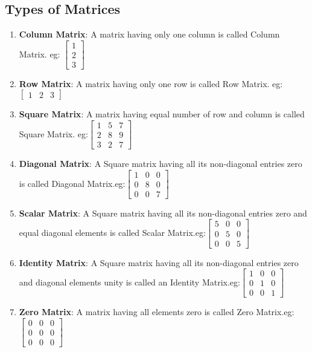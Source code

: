 \documentclass[12pt]{article}
\begin{document}
        \subsection*{Types of Matrices}
        \begin{enumerate}
          \item  \textbf{Column Matrix}: A matrix having only one column is called Column Matrix.
         eg: $\begin{bmatrix}
            1 \\
            2 \\
            3
            \end{bmatrix}$
            \item \textbf{Row Matrix}: A matrix having only one row is called Row Matrix. eg: $\begin{bmatrix}
                1 & 2 & 3
                \end{bmatrix}$
            \item   \textbf{Square Matrix}: A matrix having equal number of row and column is called Square Matrix. eg:$\begin{bmatrix}
                1 &5  &7\\
                2 & 8 & 9\\
                3 &2 &7
                \end{bmatrix}$
            \item  \textbf{Diagonal Matrix}: A Square matrix having all its non-diagonal entries zero is called Diagonal Matrix.eg:$\begin{bmatrix}
                1 &0  &0\\
                0 & 8 & 0\\
                0 &0 &7
                \end{bmatrix}$
            \item  \textbf{Scalar Matrix}: A Square matrix having all its non-diagonal entries zero and equal diagonal elements is called Scalar Matrix.eg:$\begin{bmatrix}
                5 &0  &0\\
                0 & 5 & 0\\
                0 &0 &5
                \end{bmatrix}$
            \item \textbf{Identity Matrix}: A Square matrix having all its non-diagonal entries zero and diagonal elements unity is called an Identity Matrix.eg:$\begin{bmatrix}
                1 &0  &0\\
                0 & 1 & 0\\
                0 &0 &1
                \end{bmatrix}$
            \item \textbf{Zero Matrix}: A matrix having all elements zero is called Zero Matrix.eg:$\begin{bmatrix}
                0 &0  &0\\
                0 & 0 & 0\\
                0 &0 &0
                \end{bmatrix}$
        \end{enumerate}
\end{document}
